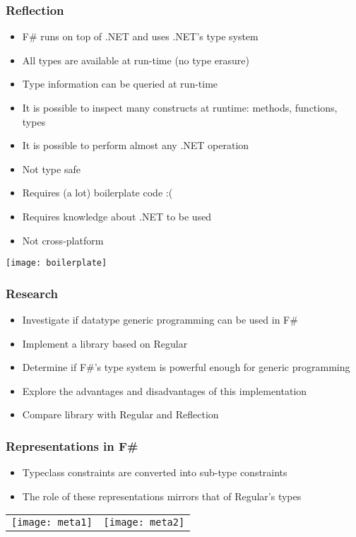 \documentclass{beamer}
\begin{document}
\begin{frame}

  \frametitle{Reflection}

  \begin{itemize}
  \item F\# runs on top of .NET and uses .NET's type system
  \item All types are available at run-time (no type erasure)
  \item Type information can be queried at run-time
  \item It is possible to inspect many constructs at runtime: methods, functions, types
  \item It is possible to perform almost any .NET operation
  \item Not type safe
  \item Requires (a lot) boilerplate code :(
  \item Requires knowledge about .NET to be used
  \item Not cross-platform
    
  \end{itemize}

  \centering\texttt{[image: boilerplate]}
  
\end{frame}

\begin{frame}

  \frametitle{Research}

  \begin{itemize}
  \item Investigate if datatype generic programming can be used in F\#
  \item Implement a library based on Regular
  \item Determine if F\#'s type system is powerful enough for generic programming
  \item Explore the advantages and disadvantages of this implementation
  \item Compare library with Regular and Reflection
    
  \end{itemize}
    
\end{frame}

\begin{frame}

  \frametitle{Representations in F\#}
  \begin{itemize}
  \item Typeclass constraints are converted into sub-type constraints
  \item The role of these representations mirrors that of Regular's
    types
  \end{itemize}
  
  \begin{tabular}{cc}
    \texttt{[image: meta1]} & \texttt{[image: meta2]} \\
  \end{tabular}
  
\end{frame}
\end{document}
